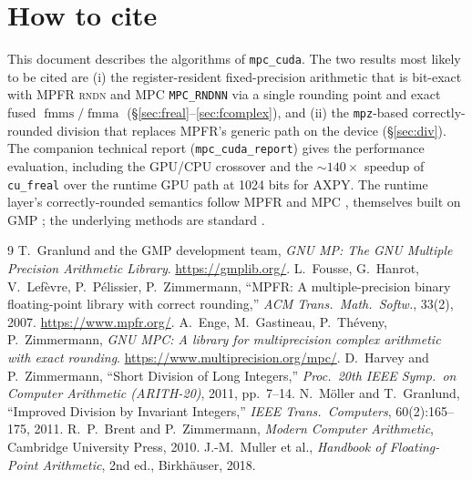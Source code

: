 \documentclass[11pt,a4paper]{article}
\newcommand{\code}[1]{\texttt{#1}}
\newcommand{\rndn}{\textsc{rndn}}
\newcommand{\fmma}{\ensuremath{\operatorname{fmma}}}
\newcommand{\fmms}{\ensuremath{\operatorname{fmms}}}
\begin{document}
\section{How to cite}
\label{sec:cite}

This document describes the algorithms of \code{mpc\_cuda}. The two results most
likely to be cited are (i) the register-resident fixed-precision arithmetic that
is bit-exact with MPFR \rndn{} and MPC \code{MPC\_RNDNN} via a single rounding
point and exact fused $\fmms/\fmma$ (\S\ref{sec:freal}--\ref{sec:fcomplex}), and
(ii) the \code{mpz}-based correctly-rounded division that replaces MPFR's
generic path on the device (\S\ref{sec:div}). The companion technical report
(\code{mpc\_cuda\_report}) gives the performance evaluation, including the
GPU/CPU crossover and the $\sim\!140\times$ speedup of \code{cu\_freal} over the
runtime GPU path at 1024 bits for AXPY. The runtime layer's correctly-rounded
semantics follow MPFR \cite{MPFR} and MPC \cite{MPC}, themselves built on GMP
\cite{GMP}; the underlying methods are standard \cite{BrentZimmermann,Muller}.

\begin{thebibliography}{9}
 T.~Granlund and the GMP development team,
  \emph{GNU MP: The GNU Multiple Precision Arithmetic Library}.
  \url{https://gmplib.org/}.
 L.~Fousse, G.~Hanrot, V.~Lef\`evre, P.~P\'elissier, P.~Zimmermann,
  ``MPFR: A multiple-precision binary floating-point library with correct
  rounding,'' \emph{ACM Trans.\ Math.\ Softw.}, 33(2), 2007.
  \url{https://www.mpfr.org/}.
 A.~Enge, M.~Gastineau, P.~Th\'eveny, P.~Zimmermann,
  \emph{GNU MPC: A library for multiprecision complex arithmetic with exact
  rounding}. \url{https://www.multiprecision.org/mpc/}.
 D.~Harvey and P.~Zimmermann,
  ``Short Division of Long Integers,''
  \emph{Proc.\ 20th IEEE Symp.\ on Computer Arithmetic (ARITH-20)}, 2011,
  pp.~7--14.
 N.~M\"oller and T.~Granlund,
  ``Improved Division by Invariant Integers,''
  \emph{IEEE Trans.\ Computers}, 60(2):165--175, 2011.
 R.~P.~Brent and P.~Zimmermann,
  \emph{Modern Computer Arithmetic}, Cambridge University Press, 2010.
 J.-M.~Muller et al.,
  \emph{Handbook of Floating-Point Arithmetic}, 2nd ed., Birkh\"auser, 2018.
\end{thebibliography}
\end{document}
